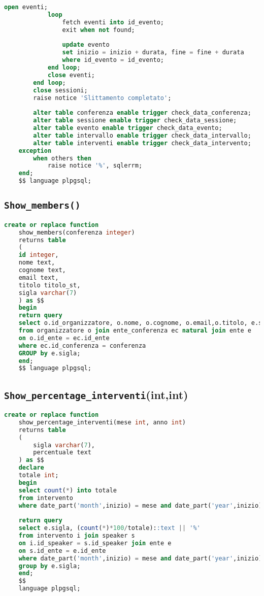 \begin{lstlisting}[language=SQL,style=mystyle]
			open eventi;
			loop
				fetch eventi into id_evento;
				exit when not found;
	
				update evento
				set inizio = inizio + durata, fine = fine + durata
				where id_evento = id_evento;
			end loop;
			close eventi;
		end loop;
		close sessioni;
		raise notice 'Slittamento completato';
	
		alter table conferenza enable trigger check_data_conferenza;
		alter table sessione enable trigger check_data_sessione;
		alter table evento enable trigger check_data_evento;
		alter table intervallo enable trigger check_data_intervallo;
		alter table interventi enable trigger check_data_intervento;
	exception
		when others then
			raise notice '%', sqlerrm;
	end;
	$$ language plpgsql;
\end{lstlisting}

\subsection{\texttt{Show\_members()}}
\begin{lstlisting}[language=SQL,style=mystyle]
	create or replace function 
	show_members(conferenza integer)
	returns table 
	(
	id integer, 
	nome text, 
	cognome text, 
	email text,
	titolo titolo_st, 
	sigla varchar(7)
	) as $$
	begin
	return query
	select o.id_organizzatore, o.nome, o.cognome, o.email,o.titolo, e.sigla
	from organizzatore o join ente_conferenza ec natural join ente e  
	on o.id_ente = ec.id_ente
	where ec.id_conferenza = conferenza
	GROUP by e.sigla;
	end;
	$$ language plpgsql;
\end{lstlisting}
\subsection{\texttt{Show\_percentage\_interventi}(int,int)}
\begin{lstlisting}[language=SQL,style=mystyle]
	create or replace function 
	show_percentage_interventi(mese int, anno int)
	returns table
	(
		sigla varchar(7),
		percentuale text
	) as $$
	declare
	totale int;
	begin
	select count(*) into totale
	from intervento
	where date_part('month',inizio) = mese and date_part('year',inizio) = anno;
	
	return query
	select e.sigla, (count(*)*100/totale)::text || '%'
	from intervento i join speaker s 
	on i.id_speaker = s.id_speaker join ente e 
	on s.id_ente = e.id_ente
	where date_part('month',inizio) = mese and date_part('year',inizio) = anno
	group by e.sigla;
	end;
	$$ 
	language plpgsql;
\end{lstlisting}
